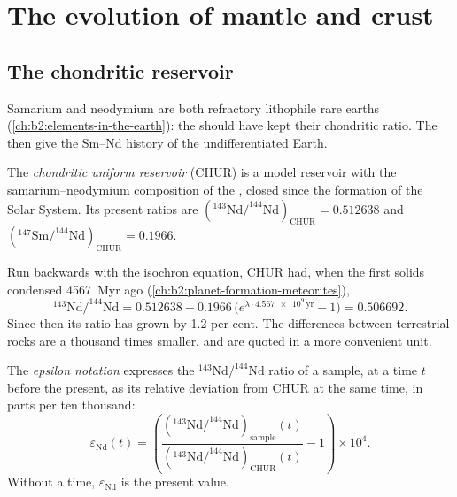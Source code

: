 \section{The evolution of mantle and crust}

\subsection{The chondritic reservoir}

Samarium and neodymium are both refractory lithophile rare earths
(\cref{ch:b2:elements-in-the-earth}): the  should have kept
their chondritic ratio. The  then give the Sm--Nd history of the
undifferentiated Earth.

\begin{definition}\label{def:b2:isotope-geochemistry:chur}
The \emph{chondritic uniform reservoir}
(CHUR) is a model reservoir with the samarium--neodymium composition of the
, closed since the formation of the Solar System. Its present
ratios are $(^{143}\mathrm{Nd}/^{144}\mathrm{Nd})_{\mathrm{CHUR}} = 0.512638$ and
$(^{147}\mathrm{Sm}/^{144}\mathrm{Nd})_{\mathrm{CHUR}} = 0.1966$.
\end{definition}

Run backwards with the isochron equation, CHUR had, when the first solids
condensed \qty{4567}{Myr} ago (\cref{ch:b2:planet-formation-meteorites}),
\[
  ^{143}\mathrm{Nd}/^{144}\mathrm{Nd} = 0.512638 - 0.1966\,\bigl(e^{\lambda\cdot
  \num{4.567e9}\,\mathrm{yr}}-1\bigr) = 0.506692 .
\] Since then its ratio has grown by
1.2 per cent. The differences between terrestrial rocks are a thousand times
smaller, and are quoted in a more convenient unit.

\begin{definition}\label{def:b2:isotope-geochemistry:epsilon}
The \emph{epsilon notation} expresses the
$^{143}\mathrm{Nd}/^{144}\mathrm{Nd}$ ratio of a sample, at a time $t$ before the
present, as its relative deviation from CHUR at the same time, in parts per ten
thousand:
\[
  \varepsilon_{\mathrm{Nd}}(t) = \left(
  \frac{(^{143}\mathrm{Nd}/^{144}\mathrm{Nd})_{\text{sample}}(t)}
       {(^{143}\mathrm{Nd}/^{144}\mathrm{Nd})_{\mathrm{CHUR}}(t)} - 1\right)\times 10^4 .
\]
Without a time, $\varepsilon_{\mathrm{Nd}}$ is the present value.
\end{definition}

